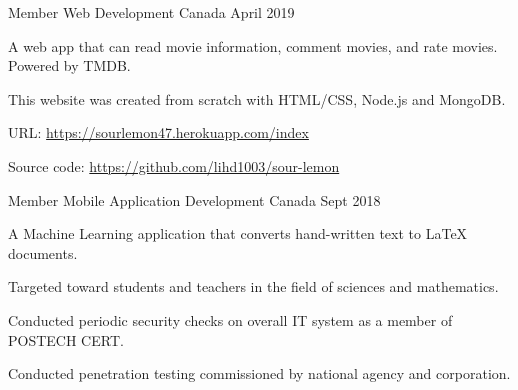     


\begin{cventries}

  \cventry
    {Member} %
    {Web Development} %
    {Canada} %
    {April 2019} %
    {
      \begin{cvitems} %
        \item {A web app that can read movie information, comment movies, and rate movies. Powered by TMDB. }
        \item {This website was created from scratch with HTML/CSS, Node.js and MongoDB.}
        \item {URL: \url{https://sourlemon47.herokuapp.com/index}}
        \item {Source code: \url{https://github.com/lihd1003/sour-lemon}}
      \end{cvitems}
    }

  \cventry
    {Member} %
    {Mobile Application Development} %
    {Canada} %
    {Sept 2018} %
    {
      \begin{cvitems} %
        \item {A Machine Learning application that converts hand-written text to LaTeX documents.}
        \item {Targeted toward students and teachers in the field of sciences and mathematics. }
        \item {Conducted periodic security checks on overall IT system as a member of POSTECH CERT.}
        \item {Conducted penetration testing commissioned by national agency and corporation.}
      \end{cvitems}
    }


\end{cventries}
